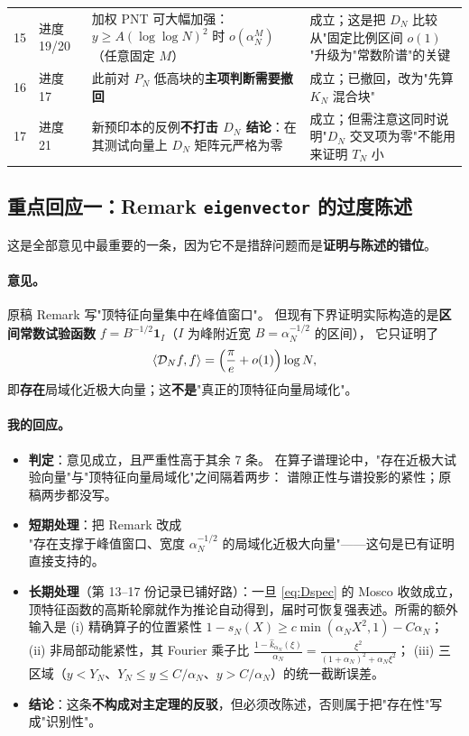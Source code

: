 \documentclass[11pt,a4paper]{ctexart}
\newcommand{\Dk}{\mathcal{D}}
\newcommand{\al}{\alpha_{N}}
\begin{document}
\begin{longtable}{@{}p{0.55cm}p{2.5cm}p{7.4cm}p{4.6cm}@{}}
15 & 进度 19/20 & 加权 PNT 可大幅加强：$y\ge A(\log\log N)^2$ 时 $o(\al^M)$（任意固定 $M$） & 成立；这是把 $D_N$ 比较从"固定比例区间 $o(1)$"升级为"常数阶谱"的关键 \\
16 & 进度 17 & 此前对 $P_N$ 低高块的\textbf{主项判断需要撤回} & 成立；已撤回，改为"先算 $K_N$ 混合块" \\
17 & 进度 21 & 新预印本的反例\textbf{不打击 $D_N$ 结论}：在其测试向量上 $D_N$ 矩阵元严格为零 & 成立；但需注意这同时说明"$D_N$ 交叉项为零"不能用来证明 $T_N$ 小 \\
\bottomrule
\end{longtable}

\subsection{重点回应一：Remark \texttt{eigenvector} 的过度陈述}\label{sec:remark}

这是全部意见中最重要的一条，因为它不是措辞问题而是\textbf{证明与陈述的错位}。

\paragraph{意见。}
原稿 Remark 写"顶特征向量集中在峰值窗口"。
但现有下界证明实际构造的是\textbf{区间常数试验函数}
$f=B^{-1/2}\mathbf 1_I$（$I$ 为峰附近宽 $B=\al^{-1/2}$ 的区间），
它只证明了
\begin{equation}
\langle\Dk_Nf,f\rangle=\Bigl(\frac{\pi}{e}+o(1)\Bigr)\log N ,
\end{equation}
即\textbf{存在}局域化近极大向量；这\textbf{不是}"真正的顶特征向量局域化"。

\paragraph{我的回应。}
\begin{itemize}
\item \textbf{判定}：意见成立，且严重性高于其余 7 条。
在算子谱理论中，"存在近极大试验向量"与"顶特征向量局域化"之间隔着两步：
谱隙正性与谱投影的紧性；原稿两步都没写。
\item \textbf{短期处理}：把 Remark 改成\\
"存在支撑于峰值窗口、宽度 $\al^{-1/2}$ 的局域化近极大向量"——这句是已有证明直接支持的。
\item \textbf{长期处理}（第 13--17 份记录已铺好路）：一旦 \eqref{eq:Dspec} 的 Mosco 收敛成立，
顶特征函数的高斯轮廓就作为推论自动得到，届时可恢复强表述。所需的额外输入是
(i) 精确算子的位置紧性 $1-s_N(X)\ge c\min(\al X^2,1)-C\al$；
(ii) 非局部动能紧性，其 Fourier 乘子比
$\frac{1-\widehat k_{\al}(\xi)}{\al}=\frac{\xi^2}{(1+\al)^2+\al\xi^2}$；
(iii) 三区域（$y<Y_N$、$Y_N\le y\le C/\al$、$y>C/\al$）的统一截断误差。
\item \textbf{结论}：这条\textbf{不构成对主定理的反驳}，但必须改陈述，否则属于把"存在性"写成"识别性"。
\end{itemize}
\end{document}
